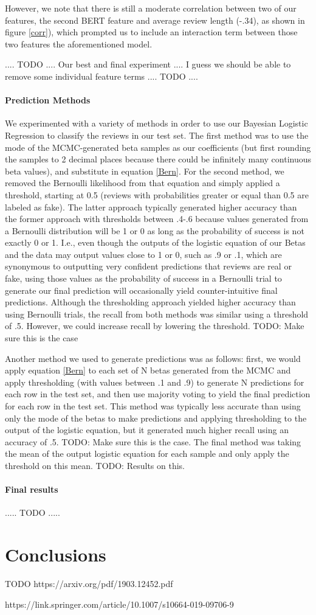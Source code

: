 \documentclass[man, floatsintext, 10pt]{apa6}
\begin{document}
However, we note that there is still a moderate correlation between two of our features, the second BERT feature and average review length (-.34), as shown in figure \ref{corr}), which prompted us to include an interaction term between those two features the aforementioned model. 

.... TODO .... Our best and final experiment .... I guess we should be able to remove some individual feature terms .... TODO ....

\vspace{2mm}

\paragraph{Prediction Methods} We experimented with a variety of methods in order to use our Bayesian Logistic Regression to classify the reviews in our test set. The first method was to use the mode of the MCMC-generated beta samples as our coefficients (but first rounding the samples to 2 decimal places because there could be infinitely many continuous beta values), and substitute in equation \ref{Bern}. For the second method, we removed the Bernoulli likelihood from that equation and simply applied a threshold, starting at 0.5 (reviews with probabilities greater or equal than 0.5 are labeled as fake). The latter approach typically generated higher accuracy than the former approach with thresholds between .4-.6 because values generated from a Bernoulli distribution will be 1 or 0 as long as the probability of success is not exactly 0 or 1. I.e., even though the outputs of the logistic equation of our Betas and the data may output values close to 1 or 0, such as .9 or .1, which are synonymous to outputting very confident predictions that reviews are real or fake, using those values as the probability of success in a Bernoulli trial to generate our final prediction will occasionally yield counter-intuitive final predictions. Although the thresholding approach yielded higher accuracy than using Bernoulli trials, the recall from both methods was similar using a threshold of .5. However, we could increase recall by lowering the threshold. TODO: Make sure this is the case

Another method we used to generate predictions was as follows: first, we would apply equation \ref{Bern} to each set of N betas generated from the MCMC and apply thresholding (with values between .1 and .9) to generate N predictions for each row in the test set, and then use majority voting to yield the final prediction for each row in the test set. This method was typically less accurate than using only the mode of the betas to make predictions and applying thresholding to the output of the logistic equation, but it generated much higher recall using an accuracy of .5. TODO: Make sure this is the case. The final method was taking the mean of the output logistic equation for each sample and only apply the threshold on this mean. TODO: Results on this.

\paragraph{Final results} ..... TODO .....

\section{Conclusions} 

TODO https://arxiv.org/pdf/1903.12452.pdf

https://link.springer.com/article/10.1007/s10664-019-09706-9
\end{document}
